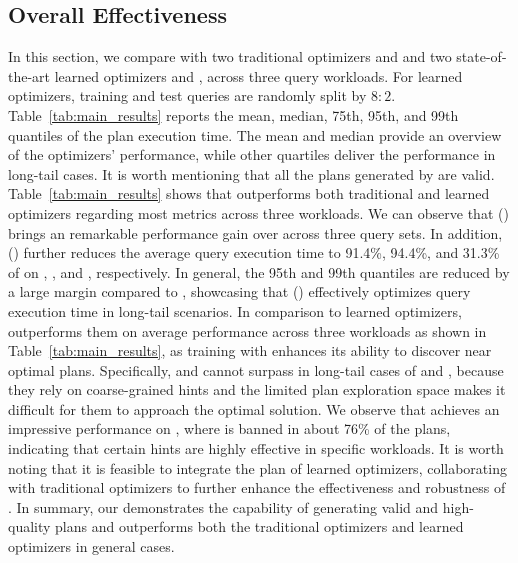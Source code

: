 \subsection{Overall Effectiveness}
\label{sec:exp:compresult}
In this section, we compare \LLMQO with two traditional optimizers \Postgres and \Oracle and two state-of-the-art learned optimizers \bao and \hybrid, across three query workloads. 
For learned optimizers, training and test queries are randomly split by $8:2$. 
Table~\ref{tab:main_results} reports the mean, median, 75th, 95th, and 99th quantiles of the plan execution time. 
The mean and median provide an overview of the optimizers' performance, while other quartiles deliver the performance in long-tail cases. 
It is worth mentioning that all the plans generated by \LLMQO are valid. 
Table~\ref{tab:main_results} shows that \LLMQO 
outperforms both traditional and learned optimizers regarding most metrics across three workloads. 
We can observe that \LLMQO (\QIT) brings an remarkable performance gain over \Postgres across three query sets. 
In addition, \LLMQO (\QDPO) further reduces the average query execution time to 91.4\%, 94.4\%, and 31.3\% of \Postgres on \imdb, \job, and \dsb, respectively.
In general, the 95th and 99th quantiles are reduced by a large margin compared to \Postgres, showcasing that \LLMQO (\QDPO) effectively optimizes query execution time in long-tail scenarios.
In comparison to learned optimizers, \LLMQO outperforms them on average performance across three workloads as shown in Table~\ref{tab:main_results}, as training \LLMQO with \QueryInstruct enhances its ability to discover near optimal plans.
Specifically, \bao and \hybrid cannot surpass \LLMQO in long-tail cases of \imdb and \job, because they rely on coarse-grained hints and the limited plan exploration space makes it difficult for them to approach the optimal solution.
We observe that \bao achieves an impressive performance on \dsb, where \NestLoop is banned in about 76\% of the plans, indicating that certain hints are highly effective in specific workloads. 
It is worth noting that it is feasible to integrate the plan of learned optimizers, collaborating with traditional optimizers to further enhance the effectiveness and robustness of \LLMQO. 
In summary, 
our \LLMQO demonstrates the capability of generating valid and high-quality plans and outperforms both the traditional optimizers and learned optimizers in general cases. 


